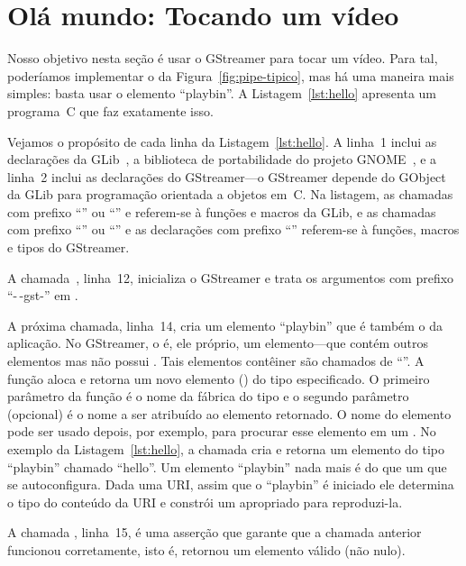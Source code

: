 \documentclass{SBCbookchapter}
\begin{document}

\section{Olá mundo: Tocando um vídeo}
\label{sec:hello}

Nosso objetivo nesta seção é usar o GStreamer para tocar um vídeo.  Para
tal, poderíamos implementar o  da Figura~\ref{fig:pipe-tipico},
mas há uma maneira mais simples: basta usar o elemento ``playbin''.
A Listagem~\ref{lst:hello} apresenta um programa~C que faz exatamente isso.



Vejamos o propósito de cada linha da Listagem~\ref{lst:hello}.  A linha~1
inclui as declarações da GLib~\cite{glib}, a biblioteca de portabilidade do
projeto GNOME~\cite{gnome}, e a linha~2 inclui as declarações do
GStreamer---o GStreamer depende do  GObject~\cite{gobject} da
GLib para programação orientada a objetos em~C\null.  Na listagem, as
chamadas com prefixo ``'' ou ``'' e referem-se à funções e
macros da GLib, e as chamadas com prefixo ``'' ou ``'' e as
declarações com prefixo ``'' referem-se à funções, macros e tipos do
GStreamer.

A chamada~, linha~12, inicializa o GStreamer e trata os
argumentos com prefixo ``-\,-gst-'' em .

A próxima chamada, linha~14, cria um elemento ``playbin'' que é também o
 da aplicação.  No GStreamer, o  é, ele próprio,
um elemento---que contém outros elementos mas não possui .  Tais
elementos contêiner são chamados de ``''.  A função
 aloca e retorna um novo elemento
() do tipo especificado.  O primeiro parâmetro da função é o
nome da fábrica do tipo e o segundo parâmetro (opcional) é o nome a ser
atribuído ao elemento retornado.  O nome do elemento pode ser usado depois,
por exemplo, para procurar esse elemento em um .  No exemplo da
Listagem~\ref{lst:hello}, a chamada cria e retorna um elemento do tipo
``playbin'' chamado ``hello''.  Um elemento ``playbin'' nada mais é do que
um  que se autoconfigura.  Dada uma URI, assim que o
``playbin'' é iniciado ele determina o tipo do conteúdo da URI e constrói um
 apropriado para reproduzi-la.

A chamada , linha~15, é uma asserção que garante que a
chamada anterior funcionou corretamente, isto é, retornou um elemento válido
(não nulo).
\end{document}
